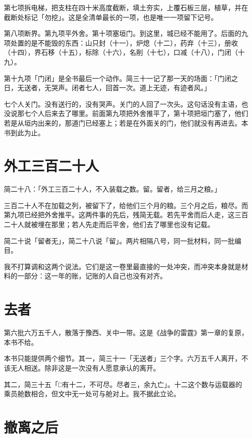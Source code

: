 第七项拆电梯，把支柱在四十米高度截断，填土夯实，上覆石板三层，植草，并在截断处标记「勿挖」。这是全清单最长的一项，也是唯一一项留下记号。

第八项断界。第九项平外舍。第十项塞垣门。到这里，城已经不能用了。后面的九项处置的是不能毁的东西：山只封（十一），炉熄（十二），药弃（十三），册收（十四），界石移（十五），标除（十六），名削（十七），口减（十八），门闭（十九）。

第十九项「门闭」是全书最后一个动作。简三十一记了那一天的场面：「门闭之日，无送者，无哭声。闭者七人，回首一次。道上无迹，有迹者风。」

七个人关门。没有送行的，没有哭声。关门的人回了一次头。这句话没有主语，也没说那七个人后来去了哪里。前面第九项把外舍推平了，第十项把垣门塞了，他们若是从垣内出来的，那道门已经塞上；若是在外面关的门，他们就没有再进去。本书到此为止。

\section{外工三百二十人}

简二十八：「外工三百二十人，不入装载之数。留。留者，给三月之粮。」

三百二十人不在加载之列，被留下了，给他们三个月的粮。三个月之后，粮尽。而第九项已经把外舍推平。这两件事的先后，残简无载。若先平舍而后人走，这三百二十人就被埋在那里；若人先走而后平舍，他们去了哪里也没有记载。

简二十说「留者无」，简二十八说「留」。两片相隔八号，同一批材料，同一批编目。

我不打算调和这两个说法。它们是这一卷里最直接的一处冲突，而冲突本身就是材料的一部分：这一年的账，记账的人自己也没有对齐。

\section{去者}

第六批六万五千人，散落于豫西、关中一带。这是《战争的雷霆》第一章的复原，本书不给。

本书只能提供两个细节。其一，简三十一「无送者」三个字。六万五千人离开，不该无人相送。除非这是一次没有人愿意承认的离开。

其二，简三十五「□有十二，不可尽。尽者三，余九亡」。十二这个数与运载器的乘员舱数相合，但文中无一处可与舱对上。我不据此立论。

\section{撤离之后}

